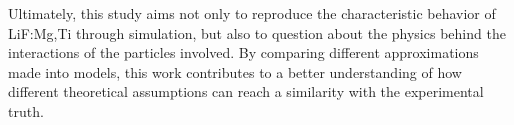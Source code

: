 \vspace{10pt}

Ultimately, this study aims not only to reproduce the characteristic behavior of LiF:Mg,Ti through simulation, but also to question about the physics behind the interactions of the particles involved. By comparing different approximations made into models, this work contributes to a better understanding of how different theoretical assumptions can reach a similarity with the experimental truth.